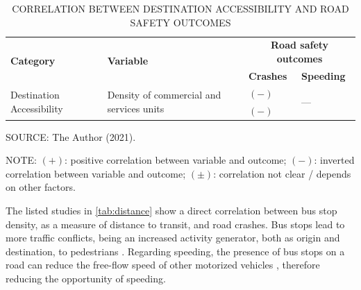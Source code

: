 \begin{table}[!hbtp]
    \footnotesize
    \captionsetup{justification=raggedright,
        singlelinecheck=false,
        font=footnotesize}
    \caption{CORRELATION BETWEEN DESTINATION ACCESSIBILITY AND ROAD SAFETY OUTCOMES}
    \centering
    \begin{tabular}{p{4cm}p{4cm}p{4cm}p{2cm}}
        \hline
        \multirow{2}{4cm}{\textbf{Category}} & \multirow{2}{4cm}{\textbf{Variable}} & \multicolumn{2}{c}{\textbf{Road safety outcomes}} \\
         &  & \textbf{Crashes} & \textbf{Speeding} \\ \hline
        \multirow{3}{4cm}{Destination Accessibility} & \multirow{3}{4cm}{Density of commercial and services units} & $(-)$ \textcite{Ouyang2014} & \multirow{2}{2cm}{---} \\
         &  & $(-)$ \textcite{Welle2016} &  \\ \hline
    \end{tabular}
    \label{tab:destination}
    \par \vspace{2mm} \footnotesize \raggedright
    SOURCE: The Author (2021).
    \par \vspace{1mm} \footnotesize \raggedright
    NOTE: $(+)$: positive correlation between variable and outcome; $(-)$: inverted correlation between variable and outcome; $(\pm)$: correlation not clear / depends on other factors.
\end{table}

The listed studies in \autoref{tab:distance} show a direct correlation between bus stop density, as a measure of distance to transit, and road crashes. Bus stops lead to more traffic conflicts, being an increased activity generator, both as origin and destination, to pedestrians \cite{Kim2010}. Regarding speeding, the presence of bus stops on a road can reduce the free-flow speed of other motorized vehicles \cite{Bansal2014, Koshy2005}, therefore reducing the opportunity of speeding. 

